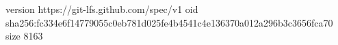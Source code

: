version https://git-lfs.github.com/spec/v1
oid sha256:fc334e6f14779055c0eb781d025fe4b4541c4e136370a012a296b3c3656fca70
size 8163
